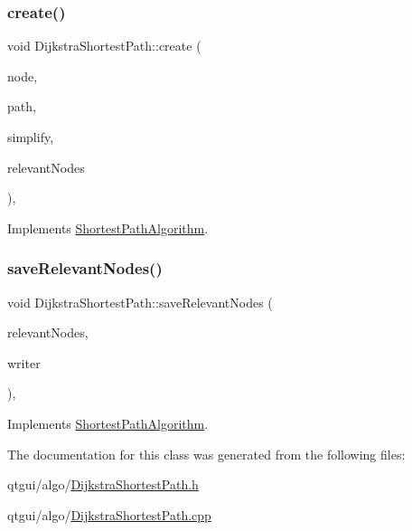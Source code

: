 \subsubsection{\texorpdfstring{create()}{create()}}
{\footnotesize\ttfamily void Dijkstra\+Shortest\+Path\+::create (\begin{DoxyParamCaption}\item[{std\+::shared\+\_\+ptr$<$ \mbox{\hyperlink{class_node_data}{Node\+Data}} $>$}]{node,  }\item[{Q\+String}]{path,  }\item[{bool}]{simplify,  }\item[{const Q\+List$<$ std\+::shared\+\_\+ptr$<$ \mbox{\hyperlink{class_node_data}{Node\+Data}} $>$ $>$ \&}]{relevant\+Nodes }\end{DoxyParamCaption})\hspace{0.3cm}{\ttfamily [override]}, {\ttfamily [virtual]}}



Implements \mbox{\hyperlink{class_shortest_path_algorithm_a2d4fc30e24f6bf057111f632ea0633bf}{Shortest\+Path\+Algorithm}}.

\mbox{\label{class_dijkstra_shortest_path_a9520d7dadce62855b5bbf6d4711f9d3f}} 
\subsubsection{\texorpdfstring{saveRelevantNodes()}{saveRelevantNodes()}}
{\footnotesize\ttfamily void Dijkstra\+Shortest\+Path\+::save\+Relevant\+Nodes (\begin{DoxyParamCaption}\item[{const Q\+List$<$ std\+::shared\+\_\+ptr$<$ \mbox{\hyperlink{class_node_data}{Node\+Data}} $>$ $>$ \&}]{relevant\+Nodes,  }\item[{std\+::function$<$ void(\mbox{\hyperlink{classtypes_1_1_node_id}{types\+::\+Node\+Id}}, \mbox{\hyperlink{classtypes_1_1_node_id}{types\+::\+Node\+Id}}, double)$>$}]{writer }\end{DoxyParamCaption})\hspace{0.3cm}{\ttfamily [override]}, {\ttfamily [virtual]}}



Implements \mbox{\hyperlink{class_shortest_path_algorithm_ab53826557f9af1fe47d66c32d2f77b79}{Shortest\+Path\+Algorithm}}.



The documentation for this class was generated from the following files\+:\begin{DoxyCompactItemize}
\item 
qtgui/algo/\mbox{\hyperlink{_dijkstra_shortest_path_8h}{Dijkstra\+Shortest\+Path.\+h}}\item 
qtgui/algo/\mbox{\hyperlink{_dijkstra_shortest_path_8cpp}{Dijkstra\+Shortest\+Path.\+cpp}}\end{DoxyCompactItemize}
